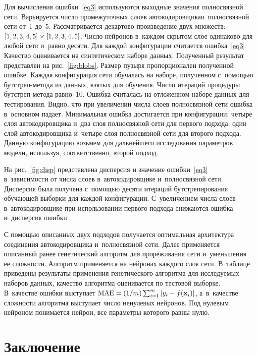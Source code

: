 \begin{multicols}{2}
Для вычисления ошибки~\eqref{eq3} используются выходные значения полносвязной 
сети. Варьируется число промежуточных слоев автокодировщика\linebreak и~полносвязной 
сети от~1 до~5. Рассматривается декартово произведение двух 
множеств:~$[1,2,3,4,5] \hm\times [1,2,3,4,5]$. Число нейронов в~каждом скрытом 
слое одинаково для любой сети и~равно десяти. Для каждой конфигурации 
считается ошибка~\eqref{eq3}. Качество оценивается на синтетическом наборе 
данных. Полученный результат представлен на рис.~\ref{fig:blobs}. Размер 
пузыря пропорционален полученной ошибке. Каждая конфигурация сети обучалась 
на наборе, полученном с~по\-мощью бут\-стреп-ме\-то\-да из данных, взятых для 
обучения. Чис\-ло итераций процедуры  
бут\-стреп-ме\-то\-да равно~10. Ошибка считалась на отложенном наборе данных 
для тестирования. Видно, что при увеличении числа слоев полносвязной сети 
ошибка в~основном падает. Минимальная ошибка достигается при конфигурации: 
четыре слоя автокодировщика и~два слоя полносвязной сети для первого подхода; 
один слой автокодировщика и~четыре слоя полносвязной сети для второго 
подхода. Данную конфигурацию возьмем для дальнейшего исследования параметров 
модели,  используя, соответственно, второй подход.

На рис.~\ref{fig:disp} представлена дисперсия %
и значение ошибки~\eqref{eq3} в~зависимости от числа слоев в~автокодировщике и~полносвязной сети. Дисперсия была получена с~помощью десяти итераций 
бутстрепирования обучающей выборки для каждой конфигурации. С~увеличением 
числа слоев в~автокодировщике при использовании первого подхода снижаются 
ошибка и~дисперсия ошибки.

С помощью описанных двух подходов получается оптимальная архитектура 
соединения автокодировщика и~полносвязной сети. Далее применяется описанный 
ранее генетический алгоритм для прореживания сети и~уменьшения ее сложности. 
Алгоритм применяется на нейронах каждого слоя сети. В~таблице приведены 
результаты применения генетического алгоритма для исследуемых наборов данных, 
качество алгоритма оценивается по тестовой выборке. В~качестве ошибки 
выступает %
$\mathrm{MAE} =({1}/{m}) \sum\nolimits_{i=1}^m|y_i\hm-f(\xb_i)|$, 
а~в~качестве сложности алгоритма выступает число ненулевых нейронов. Под нулевым 
нейроном понимается нейрон, все параметры которого равны нулю.

\section{Заключение}


\end{multicols}
